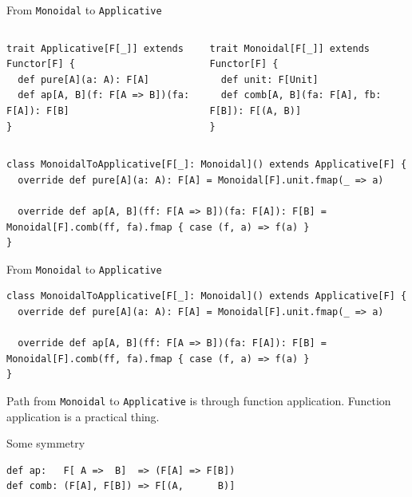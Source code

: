 \documentclass[presentation,aspectratio=169,smaller]{beamer}
\begin{document}
\begin{frame}[label={sec:orgd37ab68},fragile]{From \texttt{Monoidal} to \texttt{Applicative}}
 \begin{columns}
\begin{column}[t]{0.5\columnwidth}
\begin{verbatim}
trait Applicative[F[_]] extends Functor[F] {
  def pure[A](a: A): F[A]
  def ap[A, B](f: F[A => B])(fa: F[A]): F[B]
}
\end{verbatim}
\end{column}

\begin{column}[t]{0.5\columnwidth}
\begin{verbatim}
trait Monoidal[F[_]] extends Functor[F] {
  def unit: F[Unit]
  def comb[A, B](fa: F[A], fb: F[B]): F[(A, B)]
}
\end{verbatim}
\end{column}
\end{columns}

\begin{verbatim}
class MonoidalToApplicative[F[_]: Monoidal]() extends Applicative[F] {
  override def pure[A](a: A): F[A] = Monoidal[F].unit.fmap(_ => a)

  override def ap[A, B](ff: F[A => B])(fa: F[A]): F[B] = Monoidal[F].comb(ff, fa).fmap { case (f, a) => f(a) }
}
\end{verbatim}
\end{frame}

\begin{frame}[label={sec:org764d50a},fragile]{From \texttt{Monoidal} to \texttt{Applicative}}
 \begin{verbatim}
class MonoidalToApplicative[F[_]: Monoidal]() extends Applicative[F] {
  override def pure[A](a: A): F[A] = Monoidal[F].unit.fmap(_ => a)

  override def ap[A, B](ff: F[A => B])(fa: F[A]): F[B] = Monoidal[F].comb(ff, fa).fmap { case (f, a) => f(a) }
}
\end{verbatim}

Path from \texttt{Monoidal} to \texttt{Applicative} is through function application. Function
application is a practical thing.
\end{frame}

\begin{frame}[label={sec:orgb06a475},fragile]{Some symmetry}
 \begin{verbatim}
def ap:   F[ A =>  B]  => (F[A] => F[B])
def comb: (F[A], F[B]) => F[(A,      B)]
\end{verbatim}
\end{frame}
\end{document}
